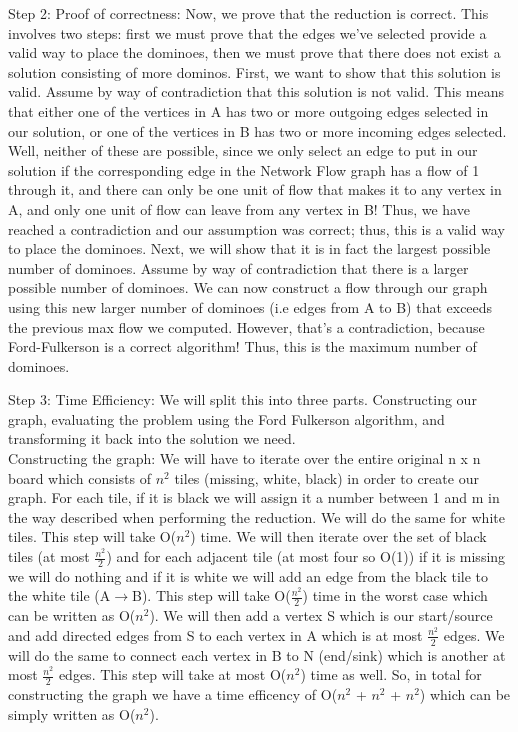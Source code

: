 \documentclass[12pt]{article}
\begin{document}
Step 2: Proof of correctness: 
Now, we prove that the reduction is correct. This involves two steps: first we must prove that the edges we’ve selected provide a valid way to place the dominoes, then we must prove that there does not exist a solution consisting of more dominos.
First, we want to show that this solution is valid. Assume by way of contradiction that this solution is not valid. This means that either one of the vertices in A has two or more outgoing edges selected in our solution, or one of the vertices in B has two or more incoming edges selected. Well, neither of these are possible, since we only select an edge to put in our solution if the corresponding edge in the Network Flow graph has a flow of 1 through it, and there can only be one unit of flow that makes it to any vertex in A, and only one unit of flow can leave from any vertex in B! Thus, we have reached a contradiction and our assumption was correct; thus, this is a valid way to place the dominoes. Next, we will show that it is in fact the largest possible number of dominoes. Assume by way of contradiction that there is a larger possible number of dominoes. We can now construct a flow through our graph using this new larger number of dominoes (i.e edges from A to B) that exceeds the previous max flow we computed. However, that’s a contradiction, because Ford-Fulkerson is a correct algorithm! Thus, this is the maximum number of dominoes.

Step 3: Time Efficiency: We will split this into three parts. Constructing our graph, evaluating the problem using the Ford Fulkerson algorithm, and transforming it back into the solution we need.\\

Constructing the graph: We will have to iterate over the entire original n x n board which consists of $n^2$ tiles (missing, white, black) in order to create our graph. For each tile, if it is black we will assign it a number between 1 and m in the way described when performing the reduction. We will do the same for white tiles. This step will take O($n^2$) time.  We will then iterate over the set of black tiles (at most $\frac{n^2}{2}$) and for each adjacent tile (at most four so O(1)) if it is missing we will do nothing and if it is white we will add an edge from the black tile to the white tile (A$\rightarrow$B). This step will take O($\frac{n^2}{2}$) time in the worst case which can be written as O($n^2$). We will then add a vertex S which is our start/source and add directed edges from S to each vertex in A which is at most $\frac{n^2}{2}$ edges. We will do the same to connect each vertex in B to N (end/sink) which is another at most $\frac{n^2}{2}$ edges. This step will take at most O($n^2$) time as well. So, in total for constructing the graph we have a time efficency of O($n^2$ + $n^2$ + $n^2$) which can be simply written as O($n^2$).\\
\end{document}
